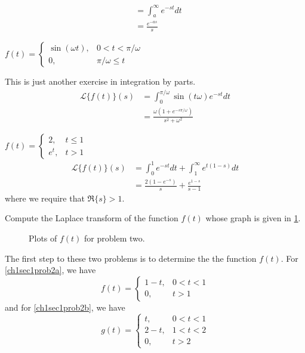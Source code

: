 \begin{exercise}
\begin{exercise}[label = (\alph*), ref = \arabic{exercisei} (\alph*)]
\begin{align*}
                             & = \int_a^{\infty}e^{-st}dt\\
                             & = \frac{e^{-as}}{s}
    \end{align*}
  \item
    \(f(t) =
    \begin{cases}
      \sin(\omega t), & 0 < t < \pi/\omega\\
      0, & \pi/\omega\leq t
    \end{cases}\)
    \par\smallskip
    This is just another exercise in integration by parts.
    \begin{align*}
      \mathcal{L}\{f(t)\}(s) & = \int_0^{\pi/\omega}\sin(t\omega)e^{-st}dt\\
                             & = \frac{\omega(1 + e^{-s\pi/\omega})}
                               {s^2 + \omega^2}
    \end{align*}
  \item
    \(f(t) =
    \begin{cases}
      2, & t\leq 1\\
      e^t, & t > 1
    \end{cases}\)
    \begin{align*}
      \mathcal{L}\{f(t)\}(s) & = \int_0^1e^{-st}dt +
                               \int_1^{\infty}e^{t(1 - s)}dt\\
                             & = \frac{2(1 - e^{-s})}{s} +
                               \frac{e^{1 - s}}{s - 1}
    \end{align*}
    where we require that \(\Re\{s\} > 1\).
  \end{exercise}
\item
  Compute the Laplace transform of the function \(f(t)\) whose graph is given
  in \cref{ch1sec1}.
  \begin{figure}[H]
    \centering
    \subcaptionbox{\label{ch1sec1prob2a}}{
      }
    \qquad
    \subcaptionbox{\label{ch1sec1prob2b}}{
      }
    \caption{Plots of \(f(t)\) for problem two.}
    \label{ch1sec1}
  \end{figure}
  The first step to these two problems is to determine the the function
  \(f(t)\).
  For \cref{ch1sec1prob2a}, we have
  \[
  f(t) =
  \begin{cases}
    1 - t, & 0 < t < 1\\
    0, & t > 1
  \end{cases}
  \]
  and for \cref{ch1sec1prob2b}, we have
  \[
  g(t) =
  \begin{cases}
    t, & 0 < t < 1\\
    2 - t, & 1 < t < 2\\
    0, & t > 2
  \end{cases}
  \]
\end{exercise}


